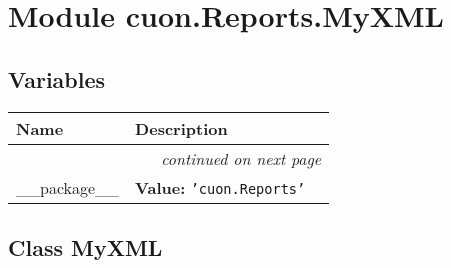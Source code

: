 %
%
%


\section{Module cuon.Reports.MyXML}

    \label{cuon:Reports:MyXML}


  \subsection{Variables}

    \vspace{-1cm}
\hspace{\varindent}\begin{longtable}{|p{\varnamewidth}|p{\vardescrwidth}|l}
\cline{1-2}
\cline{1-2} \centering \textbf{Name} & \centering \textbf{Description}& \\
\cline{1-2}
\endhead\cline{1-2}\multicolumn{3}{r}{\small\textit{continued on next page}}\\\endfoot\cline{1-2}
\endlastfoot\raggedright \_\-\_\-p\-a\-c\-k\-a\-g\-e\-\_\-\_\- & \raggedright \textbf{Value:} 
{\tt \texttt{'}\texttt{cuon.Reports}\texttt{'}}&\\
\cline{1-2}
\end{longtable}



\subsection{Class MyXML}


